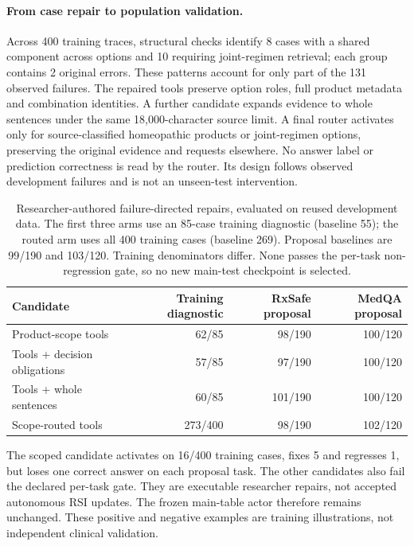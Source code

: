 \paragraph{From case repair to population validation.}
Across 400 training traces, structural checks identify 8 cases with a shared component across options and 10 requiring joint-regimen retrieval; each group contains 2 original errors. These patterns account for only part of the 131 observed failures. The repaired tools preserve option roles, full product metadata and combination identities. A further candidate expands evidence to whole sentences under the same 18,000-character source limit. A final router activates only for source-classified homeopathic products or joint-regimen options, preserving the original evidence and requests elsewhere. No answer label or prediction correctness is read by the router. Its design follows observed development failures and is not an unseen-test intervention.
\begin{table}[t]\centering\small
\setlength{\tabcolsep}{4pt}
\caption{Researcher-authored failure-directed repairs, evaluated on reused development data. The first three arms use an 85-case training diagnostic (baseline 55); the routed arm uses all 400 training cases (baseline 269). Proposal baselines are 99/190 and 103/120. Training denominators differ. None passes the per-task non-regression gate, so no new main-test checkpoint is selected.}
\label{tab:failure-repairs}
\begin{tabular}{@{}lrrr@{}}\toprule
Candidate & Training diagnostic & RxSafe proposal & MedQA proposal\\\midrule
Product-scope tools & 62/85 & 98/190 & 100/120\\
Tools + decision obligations & 57/85 & 97/190 & 100/120\\
Tools + whole sentences & 60/85 & 101/190 & 100/120\\
Scope-routed tools & 273/400 & 98/190 & 102/120\\
\bottomrule\end{tabular}
\end{table}
The scoped candidate activates on 16/400 training cases, fixes 5 and regresses 1, but loses one correct answer on each proposal task. The other candidates also fail the declared per-task gate. They are executable researcher repairs, not accepted autonomous RSI updates. The frozen main-table actor therefore remains unchanged. These positive and negative examples are training illustrations, not independent clinical validation.

